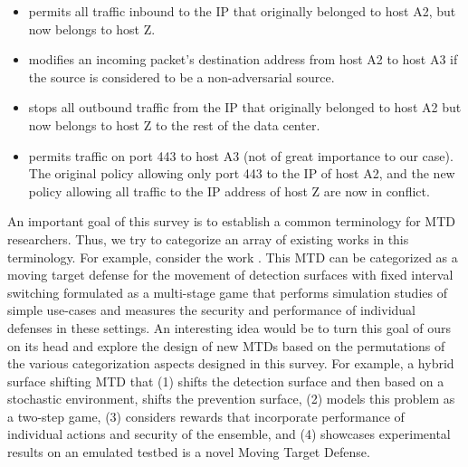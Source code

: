 \begin{itemize}
    \item permits all traffic inbound to the IP that originally belonged to host A2, but now belongs to host Z.
    \item modifies an incoming packet’s destination address from host A2 to host A3 if the source is considered to be a non-adversarial source.
    \item stops all outbound traffic from the IP that originally belonged to host A2 but now belongs to host Z to the rest of the data center.
    \item permits traffic on port 443 to host A3 (not of great importance to our case). The original policy allowing only port 443 to the IP of host A2, and the new policy allowing all traffic to the IP address of host Z are now in conflict.
\end{itemize}
\fi

An important goal of this survey is to establish a common terminology for MTD researchers. Thus, we try to categorize an array of existing works in this terminology. For example, consider the work . This MTD can be categorized as a moving target defense for the movement of detection surfaces with fixed interval switching formulated as a multi-stage game that performs simulation studies of simple use-cases and measures the security and performance of individual defenses in these settings.
An interesting idea would be to turn this goal of ours on its head and explore the design of new MTDs based on the permutations of the various categorization aspects designed in this survey. For example, a hybrid surface shifting MTD that (1) shifts the detection surface and then based on a stochastic environment, shifts the prevention surface, (2) models this problem as a two-step game, (3) considers rewards that incorporate performance of individual actions and security of the ensemble, and (4) showcases experimental results on an emulated testbed is a novel Moving Target Defense.

